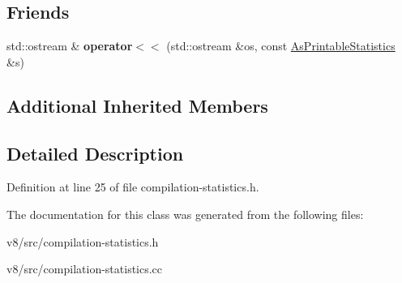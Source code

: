 \subsection*{Friends}
\begin{DoxyCompactItemize}
\item 
\mbox{\label{classv8_1_1internal_1_1CompilationStatistics_a8894c0f172258adc225e0d0c8b9504a6}} 
std\+::ostream \& {\bfseries operator$<$$<$} (std\+::ostream \&os, const \mbox{\hyperlink{structv8_1_1internal_1_1AsPrintableStatistics}{As\+Printable\+Statistics}} \&s)
\end{DoxyCompactItemize}
\subsection*{Additional Inherited Members}


\subsection{Detailed Description}


Definition at line 25 of file compilation-\/statistics.\+h.



The documentation for this class was generated from the following files\+:\begin{DoxyCompactItemize}
\item 
v8/src/compilation-\/statistics.\+h\item 
v8/src/compilation-\/statistics.\+cc\end{DoxyCompactItemize}
